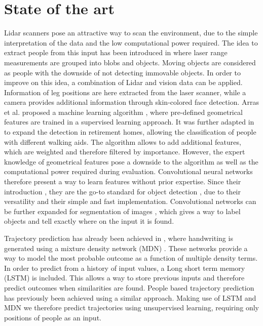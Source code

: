 \section{State of the art}

\label{sec:Stateoftheart}

Lidar scanners pose an attractive way to scan the environment, due to the simple interpretation of the data and the low computational power required.
The idea to extract people from this input has been introduced in \cite{1013691} where laser range measurements are grouped into blobs and objects. 
Moving objects are considered as people with the downside of not detecting immovable objects.
In order to improve on this idea, a combination of Lidar and vision data \cite{kleinehagenbrock2002person} can be applied. Information of leg positions are here extracted from the laser scanner, while a camera provides additional information through skin-colored face detection. 
Arras et al. proposed a machine learning algorithm \cite{Arras07usingboosted}, where pre-defined geometrical features are trained in a supervised learning approach. 
It was further adapted in \cite{weinrich2014people} to expand the detection in retirement homes, allowing the classification of people with different walking aids. 
The algorithm allows to add additional features, which are weighted and therefore filtered by importance.
However, the expert knowledge of geometrical features pose a downside to the algorithm as well as the computational power required during evaluation. Convolutional neural networks therefore present a way to learn features without prior expertise. Since their introduction \cite{lecun_gradient-based_1998}, they are the go-to standard for object detection \cite{krizhevsky_imagenet_2012}, due to their versatility and their simple and fast implementation. Convolutional networks can be further expanded for segmentation of images \cite{long2015fully}, which gives a way to label objects and tell exactly where on the input it is found.

Trajectory prediction has already been achieved in \cite{graves2013generating}, where handwriting is generated using a mixture density network (MDN) \cite{bishop1994mixture}. These networks provide a way to model the most probable outcome as a function of multiple density terms. In order to predict from a history of input values, a Long short term memory (LSTM) \cite{hochreiter1997long} is included. This allows a way to store previous inputs and therefore predict outcomes when similarities are found. People based trajectory prediction has previously been achieved \cite{alahi2016social} using a similar approach. Making use of LSTM and MDN we therefore predict trajectories using unsupervised learning, requiring only positions of people as an input.